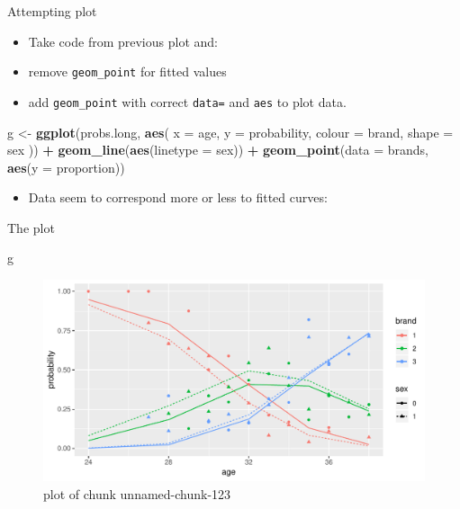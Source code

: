 \documentclass[ignorenonframetext,]{beamer}
\newenvironment{Shaded}{\begin{snugshade}}{\end{snugshade}}
\newcommand{\DataTypeTok}[1]{\textcolor[rgb]{0.13,0.29,0.53}{#1}}
\newcommand{\KeywordTok}[1]{\textcolor[rgb]{0.13,0.29,0.53}{\textbf{#1}}}
\newcommand{\NormalTok}[1]{#1}
\newcommand{\OperatorTok}[1]{\textcolor[rgb]{0.81,0.36,0.00}{\textbf{#1}}}
\newcommand{\StringTok}[1]{\textcolor[rgb]{0.31,0.60,0.02}{#1}}
\providecommand{\tightlist}{%
  \setlength{\itemsep}{0pt}\setlength{\parskip}{0pt}}
\begin{document}
\begin{frame}[fragile]{Attempting plot}
\protect\hypertarget{attempting-plot}{}

\begin{itemize}
\item
  Take code from previous plot and:
\item
  remove \texttt{geom\_point} for fitted values
\item
  add \texttt{geom\_point} with correct \texttt{data=} and \texttt{aes}
  to plot data.
\end{itemize}

\begin{Shaded}
\begin{Highlighting}[]
\NormalTok{g <-}\StringTok{ }\KeywordTok{ggplot}\NormalTok{(probs.long, }\KeywordTok{aes}\NormalTok{(}
  \DataTypeTok{x =}\NormalTok{ age, }\DataTypeTok{y =}\NormalTok{ probability,}
  \DataTypeTok{colour =}\NormalTok{ brand, }\DataTypeTok{shape =}\NormalTok{ sex}
\NormalTok{)) }\OperatorTok{+}
\StringTok{  }\KeywordTok{geom_line}\NormalTok{(}\KeywordTok{aes}\NormalTok{(}\DataTypeTok{linetype =}\NormalTok{ sex)) }\OperatorTok{+}
\StringTok{  }\KeywordTok{geom_point}\NormalTok{(}\DataTypeTok{data =}\NormalTok{ brands, }\KeywordTok{aes}\NormalTok{(}\DataTypeTok{y =}\NormalTok{ proportion))}
\end{Highlighting}
\end{Shaded}

\begin{itemize}
\tightlist
\item
  Data seem to correspond more or less to fitted curves:
\end{itemize}

\end{frame}

\begin{frame}[fragile]{The plot}
\protect\hypertarget{the-plot-2}{}

\begin{Shaded}
\begin{Highlighting}[]
\NormalTok{g}
\end{Highlighting}
\end{Shaded}

\begin{figure}
\centering
\includegraphics{figure/unnamed-chunk-123-1.pdf}
\caption{plot of chunk unnamed-chunk-123}
\end{figure}

\end{frame}
\end{document}
